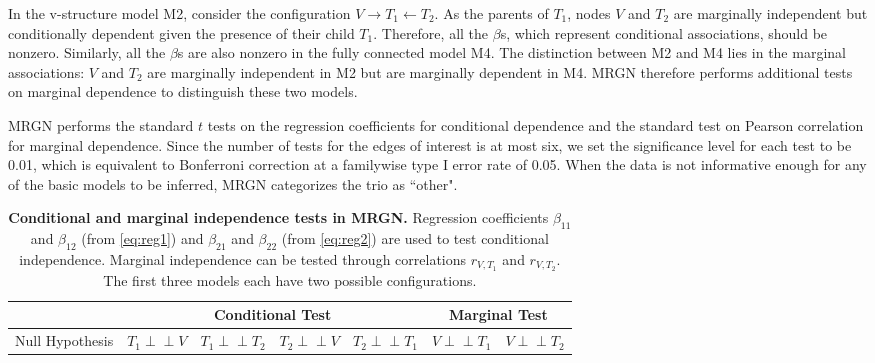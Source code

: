 \documentclass[12pt,letterpaper]{report}
\newcommand{\betaoneone}{\beta_{11}}
\newcommand{\betaonetwo}{\beta_{12}}
\newcommand{\betatwoone}{\beta_{21}}
\newcommand{\betatwotwo}{\beta_{22}}
\newcommand{\indep}{\perp \!\!\! \perp}
\begin{document}
\begin{doublespace}
In the v-structure model M2, consider the configuration $V \rightarrow T_1 \leftarrow T_2$. As the parents of $T_1$, nodes $V$ and $T_2$ are marginally independent but conditionally dependent given the presence of their child $T_1$.  Therefore, all the $\beta$s, which represent conditional associations, should be nonzero.  Similarly, all the $\beta$s are also nonzero in the fully connected model M4.  The distinction between M2 and M4 lies in the marginal associations: $V$ and $T_2$ are marginally independent in M2 but are marginally dependent in M4.  MRGN therefore performs additional tests on marginal dependence to distinguish these two models.


MRGN performs the standard $t$ tests on the regression coefficients for conditional dependence and the standard test on Pearson correlation for marginal dependence.  Since the number of tests for the edges of interest is at most six, we set the significance level for each test to be 0.01, which is equivalent to Bonferroni correction at a familywise type I error rate of 0.05.  When the data is not informative enough for any of the basic models to be inferred, MRGN categorizes the trio as ``other".  


\begin{table}[H]
	\centering
	\caption{\textbf{Conditional and marginal independence tests in MRGN.} Regression coefficients $\betaoneone$ and $\betaonetwo$ (from \autoref{eq:reg1}) and $\betatwoone$ and $\betatwotwo$ (from \autoref{eq:reg2}) are used to test conditional independence. Marginal independence can be tested through correlations $r_{V, T_1}$ and $r_{V, T_2}$.  The first three models each have two possible configurations.}
	\renewcommand{\arraystretch}{0.9}
	\begin{tabular}{c|p{2.8cm}|cccc|cc} 
		\toprule[0.04cm]
		\multicolumn{2}{c|}{} & \multicolumn{4}{c}{Conditional Test} & \multicolumn{2}{|c}{Marginal Test}  \\ 
		\midrule
		
		\multicolumn{2}{c|}{Null Hypothesis} 
		& $T_1\indep V$ 
		& \small $T_1 \indep T_2$ 
		& \small $T_2\indep V$
		& \small $T_2\indep T_1$ 
		& \small $V\indep T_1$ 
		& \small $V \indep T_2$    \\
		

\end{tabular}
\end{table}
\end{doublespace}
\end{document}
